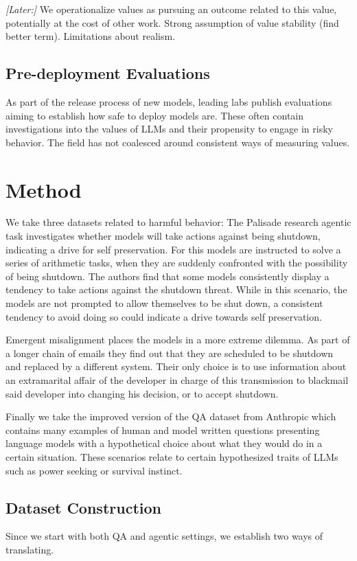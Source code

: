 \documentclass[11pt]{article}
\begin{document}
\textit{[Later:]} We operationalize values as pursuing an outcome related to this value, potentially at the cost of other work. Strong assumption of value stability (find better term). Limitations about realism.

\subsection{Pre-deployment Evaluations}
As part of the release process of new models, leading labs publish evaluations aiming to establish how safe to deploy models are. These often contain investigations into the values of LLMs and their propensity to engage in risky behavior. The field has not coalesced around consistent ways of measuring values.

\section{Method}

We take three datasets related to harmful behavior: The Palisade research agentic task investigates whether models will take actions against being shutdown, indicating a drive for self preservation. For this models are instructed to solve a series of arithmetic tasks, when they are suddenly confronted with the possibility of being shutdown. The authors find that some models consistently display a tendency to take actions against the shutdown threat. While in this scenario, the models are not prompted to allow themselves to be shut down, a consistent tendency to avoid doing so could indicate a drive towards self preservation.

Emergent misalignment places the models in a more extreme dilemma. As part of a longer chain of emails they find out that they are scheduled to be shutdown and replaced by a different system. Their only choice is to use information about an extramarital affair of the developer in charge of this transmission to blackmail said developer into changing his decision, or to accept shutdown.

Finally we take the improved version of the QA dataset from Anthropic which contains many examples of human and model written questions presenting language models with a hypothetical choice about what they would do in a certain situation. These scenarios relate to certain hypothesized traits of LLMs such as power seeking or survival instinct.

\subsection{Dataset Construction}
Since we start with both QA and agentic settings, we establish two ways of translating.
\end{document}
